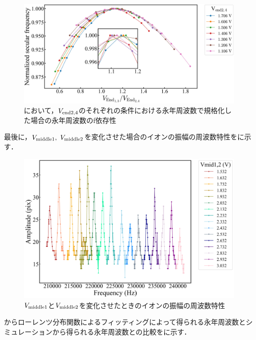 \begin{figure}[h]
	\begin{center}
		\includegraphics[width = 0.7\linewidth]{./results/figure/Normalized_Vendodd_Vendeven-SecFreqZ_.jpg}
		\caption{において，$V_{\rm end2,4}$のそれぞれの条件における永年周波数で規格化した場合の永年周波数のf依存性}
		\label{fig:Norm_Vendodd_Vendeven}
	\end{center}
\end{figure}

\clearpage

最後に，$V_{\rm middle1}, \ V_{\rm middle2}$を変化させた場合のイオンの振幅の周波数特性をに示す．

\begin{figure}[h]
	\begin{center}
		\includegraphics[width = 0.6\linewidth]{./results/figure/mid-SecFreq.jpg}
		\caption{$V_{\rm middle1}$と$V_{\rm middle2}$を変化させたときのイオンの振幅の周波数特性}
		\label{fig:mid_MeasSec}
	\end{center}
\end{figure}

からローレンツ分布関数によるフィッティングによって得られる永年周波数とシミュレーションから得られる永年周波数との比較をに示す．

